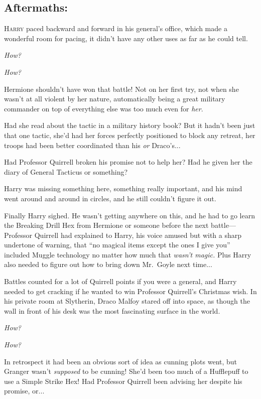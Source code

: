 
\subsection{Aftermaths:}

\lettrine{H}{arry} paced backward and forward in his general’s office, which made a wonderful room for pacing, it didn’t have any other uses as far as he could tell.

\emph{How?}

\emph{How?}

Hermione shouldn’t have won that battle! Not on her first try, not when she wasn’t at all violent by her nature, automatically being a great military commander on top of everything else was too much even for \emph{her}.

Had she read about the tactic in a military history book? But it hadn’t been just that one tactic, she’d had her forces perfectly positioned to block any retreat, her troops had been better coordinated than his \emph{or} Draco’s...

Had Professor Quirrell broken his promise not to help her? Had he given her the diary of General Tacticus or something?

Harry was missing something here, something really important, and his mind went around and around in circles, and he still couldn’t figure it out.

Finally Harry sighed. He wasn’t getting anywhere on this, and he had to go learn the Breaking Drill Hex from Hermione or someone before the next battle—Professor Quirrell had explained to Harry, his voice amused but with a sharp undertone of warning, that “no magical items except the ones I give you” included Muggle technology no matter how much that \emph{wasn’t magic.} Plus Harry also needed to figure out how to bring down Mr.~Goyle next time...

Battles counted for a lot of Quirrell points if you were a general, and Harry needed to get cracking if he wanted to win Professor Quirrell’s Christmas wish.
\sbreak
In his private room at Slytherin, Draco Malfoy stared off into space, as though the wall in front of his desk was the most fascinating surface in the world.

\emph{How?}

\emph{How?}

In retrospect it had been an obvious sort of idea as cunning plots went, but Granger wasn’t \emph{supposed} to be cunning! She’d been too much of a Hufflepuff to use a Simple Strike Hex! Had Professor Quirrell been advising her despite his promise, or...

